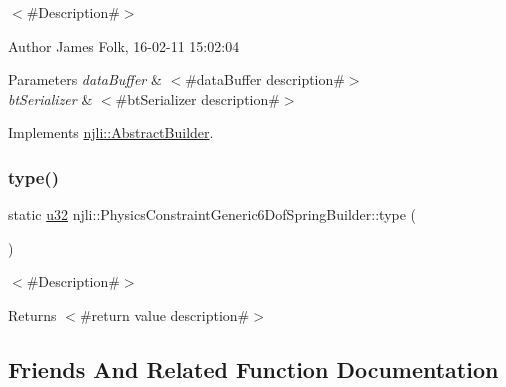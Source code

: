 $<$\#\+Description\#$>$ 

\begin{DoxyAuthor}{Author}
James Folk, 16-\/02-\/11 15\+:02\+:04
\end{DoxyAuthor}

\begin{DoxyParams}{Parameters}
{\em data\+Buffer} & $<$\#data\+Buffer description\#$>$ \\
\hline
{\em bt\+Serializer} & $<$\#bt\+Serializer description\#$>$ \\
\hline
\end{DoxyParams}


Implements \mbox{\hyperlink{classnjli_1_1_abstract_builder_ab66b774e02ccb9da554c9aab7fa6d981}{njli\+::\+Abstract\+Builder}}.

\mbox{\label{classnjli_1_1_physics_constraint_generic6_dof_spring_builder_abadc19b66e278a4dcc7b7d3d2bb2df42}} 
\subsubsection{\texorpdfstring{type()}{type()}}
{\footnotesize\ttfamily static \mbox{\hyperlink{_util_8h_a10e94b422ef0c20dcdec20d31a1f5049}{u32}} njli\+::\+Physics\+Constraint\+Generic6\+Dof\+Spring\+Builder\+::type (\begin{DoxyParamCaption}{ }\end{DoxyParamCaption})\hspace{0.3cm}{\ttfamily [static]}}

$<$\#\+Description\#$>$

\begin{DoxyReturn}{Returns}
$<$\#return value description\#$>$ 
\end{DoxyReturn}


\subsection{Friends And Related Function Documentation}
\mbox{\label{classnjli_1_1_physics_constraint_generic6_dof_spring_builder_acb96ebb09abe8f2a37a915a842babfac}} 

